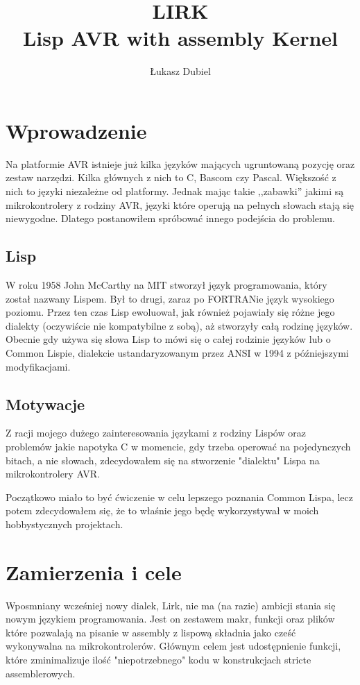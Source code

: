 \documentclass[11pt]{article}
\author{Łukasz Dubiel}
\title{LIRK \\ Lisp AVR with assembly Kernel}
\begin{document}
\maketitle

\section{Wprowadzenie}

Na platformie AVR istnieje już kilka języków mających ugruntowaną pozycję oraz zestaw narzędzi. Kilka głównych z nich to C, Bascom czy Pascal. Większość z nich to języki niezależne od platformy. Jednak mając takie ,,zabawki'' jakimi są mikrokontrolery z rodziny AVR, języki które operują na pełnych słowach stają się niewygodne. Dlatego postanowiłem spróbować innego podejścia do problemu.

\subsection{Lisp}

W roku 1958 John McCarthy na MIT stworzył język programowania, który został nazwany Lispem. Był to drugi, zaraz po FORTRANie język wysokiego poziomu. Przez ten czas Lisp ewoluował, jak również pojawiały się różne jego dialekty (oczywiście nie kompatybilne z sobą), aż stworzyły całą rodzinę języków. Obecnie gdy używa się słowa Lisp to mówi się o całej rodzinie języków lub o Common Lispie, dialekcie ustandaryzowanym przez ANSI w 1994 z późniejszymi modyfikacjami.

\subsection{Motywacje}

Z racji mojego dużego zainteresowania językami z rodziny Lispów oraz problemów jakie napotyka C w momencie, gdy trzeba operować na pojedynczych bitach, a nie słowach, zdecydowałem się na stworzenie "dialektu" Lispa na mikrokontrolery AVR. 

Początkowo miało to być ćwiczenie w celu lepszego poznania Common Lispa, lecz potem zdecydowałem się, że to właśnie jego będę wykorzystywał w moich hobbystycznych projektach.

\section{Zamierzenia i cele}
Wposmniany wcześniej nowy dialek, Lirk,  nie ma (na razie) ambicji stania się nowym językiem programowania. Jest on zestawem makr, funkcji oraz plików które pozwalają na pisanie w assembly z lispową składnia jako cześć wykonywalna na mikrokontrolerów. Głównym celem jest udostępnienie funkcji, które zminimalizuje ilość "niepotrzebnego" kodu w konstrukcjach stricte assemblerowych.
\end{document}
